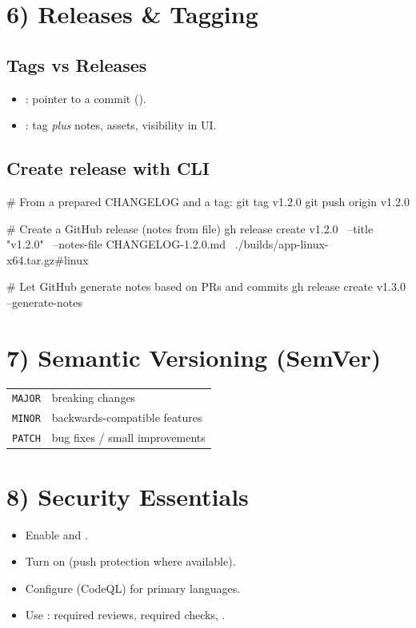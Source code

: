 \documentclass[11pt]{article}
\begin{document}
\section*{6) Releases \& Tagging}

\subsection*{Tags vs Releases}

\begin{itemize}
  \item {}: pointer to a commit ().
  \item {}: tag \textit{plus} notes, assets, visibility in UI.
\end{itemize}

\subsection*{Create release with CLI}

\begin{bashcode}
# From a prepared CHANGELOG and a tag:
git tag v1.2.0
git push origin v1.2.0

# Create a GitHub release (notes from file)
gh release create v1.2.0 \
  --title "v1.2.0" \
  --notes-file CHANGELOG-1.2.0.md \
  ./builds/app-linux-x64.tar.gz#linux

# Let GitHub generate notes based on PRs and commits
gh release create v1.3.0 --generate-notes
\end{bashcode}

\section*{7) Semantic Versioning (SemVer)}

\begin{tabular}{@{}ll@{}}
\texttt{MAJOR} & breaking changes \\
\texttt{MINOR} & backwards-compatible features \\
\texttt{PATCH} & bug fixes / small improvements \\
\end{tabular}

\section*{8) Security Essentials}

\begin{itemize}
  \item Enable  and .
  \item Turn on  (push protection where available).
  \item Configure  (CodeQL) for primary languages.
  \item Use \term{branch protection}: required reviews, required checks, .
\end{itemize}
\end{document}
